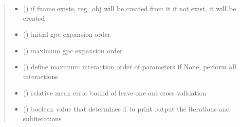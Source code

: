 \documentclass[letterpaper,10pt,english,openany,oneside]{sphinxmanual}
\begin{document}
\begin{fulllineitems}
\begin{quote}
\begin{description}
\begin{itemize}
\item {} 
 (\sphinxstyleliteralemphasis{\sphinxupquote{, }}\sphinxstyleliteralemphasis{\sphinxupquote{, }}) \textendash{} if fname exists, reg\_obj will be created from it
if not exist, it will be created

\item {} 
 (\sphinxstyleliteralemphasis{\sphinxupquote{, }}\sphinxstyleliteralemphasis{\sphinxupquote{, }}) \textendash{} initial gpc expansion order

\item {} 
 (\sphinxstyleliteralemphasis{\sphinxupquote{, }}\sphinxstyleliteralemphasis{\sphinxupquote{, }}) \textendash{} maximum gpc expansion order

\item {} 
 (\sphinxstyleliteralemphasis{\sphinxupquote{, }}\sphinxstyleliteralemphasis{\sphinxupquote{, }}) \textendash{} define maximum interaction order of parameters
if None, perform all interactions

\item {} 
 (\sphinxstyleliteralemphasis{\sphinxupquote{, }}\sphinxstyleliteralemphasis{\sphinxupquote{, }}) \textendash{} relative mean error bound of leave one out cross validation

\item {} 
 (\sphinxstyleliteralemphasis{\sphinxupquote{, }}\sphinxstyleliteralemphasis{\sphinxupquote{, }}) \textendash{} boolean value that determines if to print output the iterations and subiterations


\end{itemize}
\end{description}
\end{quote}
\end{fulllineitems}
\end{document}
